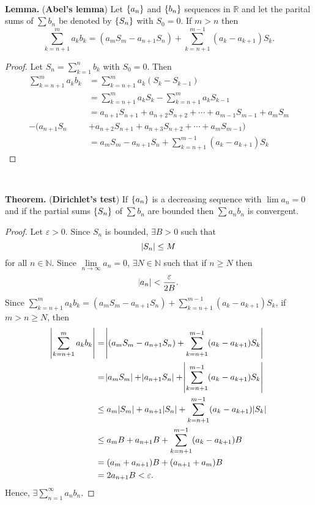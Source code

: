 \documentclass[12pt,a4paper]{article}
\newcommand{\dispsty}{\displaystyle}
\begin{document}
\
\begin{tcolorbox}[colback=white]
	\textbf{Lemma.} (\textbf{Abel's lemma}) Let $\set{a_n}$ and $\set{b_n}$ sequences in $\mathbb{R}$ and let the parital sums of $\sum b_n$ be denoted by $\set{S_n}$ with $S_0=0$. If $m>n$ then \[
	\sum_{k=n+1}^ma_kb_k=(a_mS_m-a_{n+1}S_n)+\sum_{k=n+1}^{m-1}(a_k-a_{k+1})S_k.
	\]\tcblower\begin{proof}
		Let $S_n=\dispsty\sum_{k=1}^n b_k$ with $S_0=0$. Then \begin{align*}
		\sum_{k=n+1}^ma_kb_k&=\sum_{k=n+1}^ma_k(S_k-S_{k-1}) \\
		&=\sum_{k=n+1}^ma_kS_k-\sum_{k=n+1}^ma_kS_{k-1} \\
		&=a_{n+1}S_{n+1}+a_{n+2}S_{n+2} +\cdots+a_{m-1}S_{m-1}+a_mS_m \\
		-(a_{n+1}S_{n}&+a_{n+2}S_{n+1}+a_{n+3}S_{n+2} +\cdots+a_mS_{m-1}) \\
		&=a_mS_m-a_{n+1}S_n+\sum_{k=n+1}^{m-1}(a_k-a_{k+1})S_k
		\end{align*}
	\end{proof}
\end{tcolorbox}
\
\begin{tcolorbox}[colback=white]
	\textbf{Theorem.} (\textbf{Dirichlet's test}) If $\set{a_n}$ is a decreasing sequence with $\lim a_n=0$ and if the partial sums $\set{S_n}$ of $\sum b_n$ are bounded then $\sum a_nb_n$ is convergent.\tcblower\begin{proof}
		Let $\varepsilon>0$. Since $S_n$ is bounded, $\exists B>0$ such that \[
		\abs{S_n}\leq M
		\] for all $n\in\mathbb{N}$. Since $\lim\limits_{n\to\infty}a_n=0$, $\exists N\in\mathbb{N}$ such that if $n\geq N$ then \[
		\abs{a_n}<\frac{\varepsilon}{2B}.
		\] Since $\dispsty\sum_{k=n+1}^ma_kb_k=(a_mS_m-a_{n+1}S_n)+\sum_{k=n+1}^{m-1}(a_k-a_{k+1})S_k$, if $m>n\geq N$, then \begin{align*}
		\abs{\sum_{k=n+1}^ma_kb_k}&=\abs{(a_mS_m-a_{n+1}S_n)+\sum_{k=n+1}^{m-1}(a_k-a_{k+1})S_k} \\
		&=\abs{a_mS_m}+\abs{a_{n+1}S_n}+\abs{\sum_{k=n+1}^{m-1}(a_k-a_{k+1})S_k} \\
		&\leq a_m\abs{S_m}+a_{n+1}\abs{S_n}+\sum_{k=n+1}^{m-1}(a_k-a_{k+1})\abs{S_k} \\
		&\leq a_mB+a_{n+1}B+\sum_{k=n+1}^{m-1}(a_k-a_{k+1})B \\
		&=(a_m+a_{n+1})B+(a_{n+1}+a_m)B \\
		&=2a_{n+1}B<\varepsilon.
		\end{align*} Hence, $\exists\sum_{n=1}^\infty a_nb_n$.
	\end{proof}
\end{tcolorbox}
\end{document}

